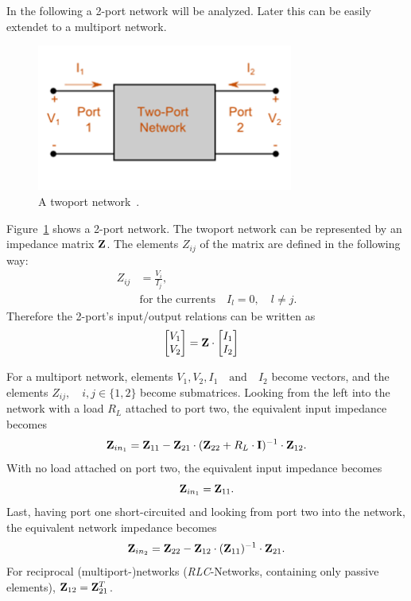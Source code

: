 In the following a 2-port network will be analyzed.
Later this can be easily extendet to a multiport network.
\begin{figure}[h]
\begin{center}
\includegraphics[width=0.75\textwidth]{images/twoport.png}
\caption{A twoport network~\cite{magnus:twoport}.}
\label{fig:twoport}
\end{center}
\end{figure}

Figure~\ref{fig:twoport} shows a 2-port network.
The twoport network can be represented by an impedance matrix $\mathbf{Z}$.
The elements $Z_{ij}$ of the matrix are defined in the following way:
\begin{align}
\label{eq:multiport_impedance}
Z_{ij} &= \frac{V_i}{I_j},\\\nonumber
&\text{for the currents}\quad I_l = 0,\quad l\neq j.
\end{align}
Therefore the 2-port's input/output relations can be written as
\begin{align}
\label{eq:twoport_io}
\begin{bmatrix}
V_1\\V_2
\end{bmatrix} &= \mathbf{Z} \cdot
\begin{bmatrix}
I_1\\I_2
\end{bmatrix}
\end{align}

For a multiport network, elements $V_1,V_2,I_1\quad\text{and}\quad I_2$ become vectors, and the elements $Z_{ij},\quad i,j\in\{1,2\}$ become submatrices.
Looking from the left into the network with a load $R_L$ attached to port two, the equivalent input impedance becomes
\begin{equation}
\label{eq:eq_imp_load}
\mathbf{Z}_{in_1} = \mathbf{Z}_{11} - \mathbf{Z}_{21}\cdot(\mathbf{Z}_{22} + R_L\cdot\mathbf{I})^{-1}\cdot \mathbf{Z}_{12}.
\end{equation}
With no load attached on port two, the equivalent input impedance becomes
\begin{equation}
\label{eq:eq_imp_oc}
\mathbf{Z}_{in_1} = \mathbf{Z}_{11}.
\end{equation}
Last, having port one short-circuited and looking from port two into the network, the equivalent network impedance becomes
\begin{equation}
\label{eq:eq_imp_sc}
\mathbf{Z}_{in_2} = \mathbf{Z}_{22} - \mathbf{Z}_{12}\cdot(\mathbf{Z}_{11})^{-1}\cdot \mathbf{Z}_{21}.
\end{equation}
For reciprocal (multiport-)networks (\textit{RLC}-Networks, containing only passive elements), $\mathbf{Z}_{12} = \mathbf{Z}_{21}^T$.

